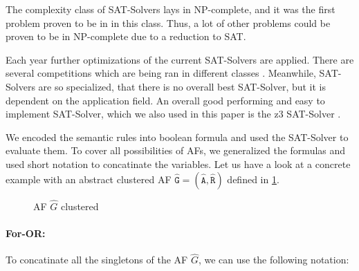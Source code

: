 The complexity class of SAT-Solvers lays in NP-complete, and it was the first problem proven to be in in this class. Thus, a lot of other problems could be proven to be in NP-complete due to a reduction to SAT.


Each year further optimizations of the current SAT-Solvers are applied. There are several competitions which are being ran in different classes \cite{SAT-Solver-Competition}. Meanwhile, SAT-Solvers are so specialized, that there is no overall best SAT-Solver, but it is dependent on the application field. An overall good performing and easy to implement SAT-Solver, which we also used in this paper is the z3 SAT-Solver \cite{z3-SAT-Solver}.


We encoded the semantic rules into boolean formula and used the SAT-Solver to evaluate them. To cover all possibilities of AFs, we generalized the formulas and used short notation to concatinate the variables. Let us have a look at a concrete example with an abstract clustered AF $\mathtt{\hat{G}=(\hat{A}, \hat{R})}$ defined in \ref{af:backgroundSATExample1}.



\begin{figure}[h]
    \centering
    \caption{\ac{AF} $\hat{G}$ clustered}
    \label{af:backgroundSATExample1}
\end{figure}

\paragraph{For-OR:} To concatinate all the singletons of the AF $\hat{G}$, we can use the following notation:


